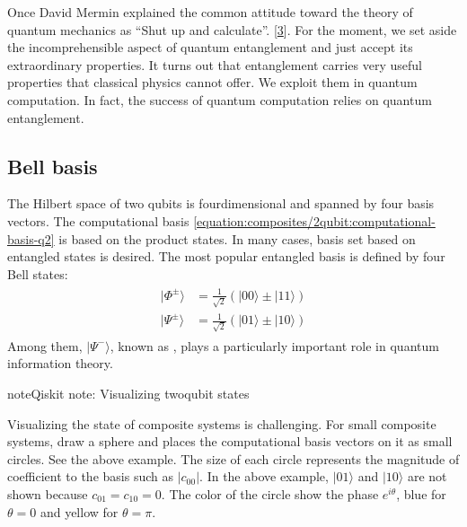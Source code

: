 \documentclass[letterpaper,10pt,english]{jupyterBook}
\begin{document}
\sphinxAtStartPar
Once David Mermin explained the common attitude toward the theory of quantum mechanics as “Shut up and calculate”. {[}\hyperlink{cite.references:id19}{3}{]}.   For the moment, we set aside the incomprehensible aspect of quantum entanglement and just accept its extraordinary properties.  It turns out that entanglement carries very useful properties that classical physics cannot offer. We exploit them in quantum computation.  In fact, the success of quantum computation relies on quantum entanglement.


\subsection{Bell basis}
\label{\detokenize{composites/2qubit:bell-basis}}
\sphinxAtStartPar
The Hilbert space of two qubits is four\sphinxhyphen{}dimensional and spanned by four basis vectors.  The computational basis \eqref{equation:composites/2qubit:computational-basis-q2} is based on the product states.  In many cases, basis set based on entangled states is desired.  The most popular entangled basis is  defined by four Bell states:
\begin{equation*}
\begin{split}
\begin{align}
|\Phi^{\pm}\rangle &= \frac{1}{\sqrt{2}} \left(|00\rangle \pm |11\rangle\right) \\
|\Psi^{\pm}\rangle &= \frac{1}{\sqrt{2}} \left(|01\rangle \pm |10\rangle\right)
\end{align}
\end{split}
\end{equation*}
\sphinxAtStartPar
Among them, \(|\Psi^{-}\rangle\), known as , plays a particularly important role in quantum information theory.

\begin{sphinxadmonition}{note}{Qiskit note: Visualizing two\sphinxhyphen{}qubit states}

\sphinxAtStartPar
Visualizing the state of composite systems is challenging.  For small composite systems,  draw a sphere and places the computational basis vectors on it as small circles. See the above example.  The size of each circle represents the magnitude of coefficient to the basis such as \(|c_{00}|\). In the above example, \(|01\rangle\) and \(|10\rangle\) are not shown because \(c_{01}=c_{10}=0\). The color of the circle show the phase \(e^{i \theta}\), blue for \(\theta=0\) and yellow for \(\theta=\pi\).
\end{sphinxadmonition}
\end{document}
